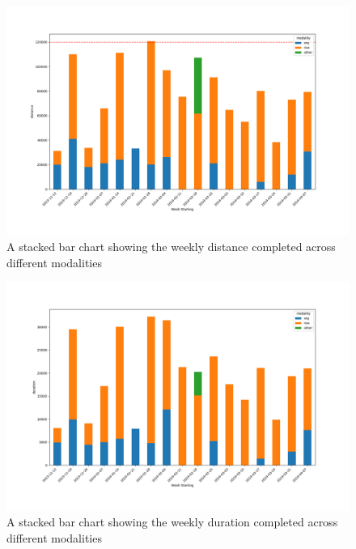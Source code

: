 \begin{figure}[!hp]
  \centering
  \includegraphics[width=\linewidth]{figures/distanceVsMod.png}
  \captionsetup{justification=centering}
  \caption*{\label{fig:app_distanceVsMod}A stacked bar chart showing the weekly distance completed across different modalities}
\end{figure}
\begin{figure}[!hp]
  \centering
  \includegraphics[width=\linewidth]{figures/durationVsMod.png}
  \captionsetup{justification=centering}
  \caption*{\label{fig:app_durationVsMod}A stacked bar chart showing the weekly duration completed across different modalities}
\end{figure}

\newpage
